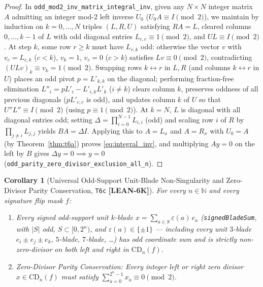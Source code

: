 \documentclass[11pt,reqno]{amsart}
\newcommand{\code}[1]{\textnormal{\texttt{\small\nolinkurl{#1}}}}
\theoremstyle{plain}
\newtheorem{corollary}[theorem]{Corollary}
\theoremstyle{definition}
\theoremstyle{remark}
\newcommand{\tagLean}{\mbox{\textsf{\textbf{\color{oiBlue}[LEAN-6K]}}}}
\newcommand{\CD}{\mathrm{CD}}
\newcommand{\N}{\mathbb{N}}
\begin{document}
\begin{proof}
In \code{odd_mod2_inv_matrix_integral_inv}, given any $N \times N$ integer matrix $A$ admitting an
integer mod-$2$ left inverse $U_0$ ($U_0 A \equiv I \pmod 2$), we maintain by induction on
$k = 0, \dots, N$ triples $(L, R, U)$ satisfying $R A = L$, cleared columns $0, \dots, k - 1$ of
$L$ with odd diagonal entries $L_{c,c} \equiv 1 \pmod 2$, and $U L \equiv I \pmod 2$. At step $k$,
some row $r \ge k$ must have $L_{r,k}$ odd: otherwise the vector $v$ with $v_c = L_{c,k}$ ($c < k$),
$v_k = 1$, $v_c = 0$ ($c > k$) satisfies $L v \equiv 0 \pmod 2$, contradicting
$(U L v)_k \equiv v_k = 1 \pmod 2$. Swapping rows $k \leftrightarrow r$ in $L, R$ (and columns
$k \leftrightarrow r$ in $U$) places an odd pivot $p = L'_{k,k}$ on the diagonal; performing
fraction-free elimination $L''_i = p L'_i - L'_{i,k} L'_k$ ($i \neq k$) clears column $k$,
preserves oddness of all previous diagonals ($p L'_{c,c}$ is odd), and updates column $k$ of $U$
so that $U'' L'' \equiv I \pmod 2$ (using $p \equiv 1 \pmod 2$). At $k = N$, $L$ is diagonal with
all diagonal entries odd; setting $\Delta = \prod_{i=0}^{N-1} L_{i,i}$ (odd) and scaling row $i$
of $R$ by $\prod_{j \neq i} L_{j,j}$ yields $B A = \Delta I$. Applying this to $A = L_x$ and
$A = R_x$ with $U_0 = A$ (by Theorem~\ref{thm:t6a}) proves \eqref{eq:integral_inv}, and
multiplying $A y = 0$ on the left by $B$ gives $\Delta y = 0 \implies y = 0$
(\code{odd_parity_zero_divisor_exclusion_all_n}).
\end{proof}

\begin{corollary}[Universal Odd-Support Unit-Blade Non-Singularity and Zero-Divisor Parity Conservation, \texttt{T6c} \tagLean]
\label{thm:t6c}
For every $n \in \N$ and every signature flip mask $f$:
\begin{enumerate}[leftmargin=2em]
  \item Every signed odd-support unit $k$-blade $x = \sum_{a \in S} \varepsilon(a)\, e_a$
    (\code{signedBladeSum}, with $|S|$ odd, $S \subset [0, 2^n)$, and $\varepsilon(a) \in \{\pm 1\}$
    --- including \emph{every} unit $3$-blade $e_i \pm e_j \pm e_k$, $5$-blade, $7$-blade, \dots)
    has odd coordinate sum and is strictly non-zero-divisor on both left and right in $\CD_n(f)$.
  \item \emph{Zero-Divisor Parity Conservation:} Every integer left or right zero divisor
    $x \in \CD_n(f)$ must satisfy $\sum_{a = 0}^{2^n - 1} x_a \equiv 0 \pmod 2$.
\end{enumerate}
\end{corollary}
\end{document}
